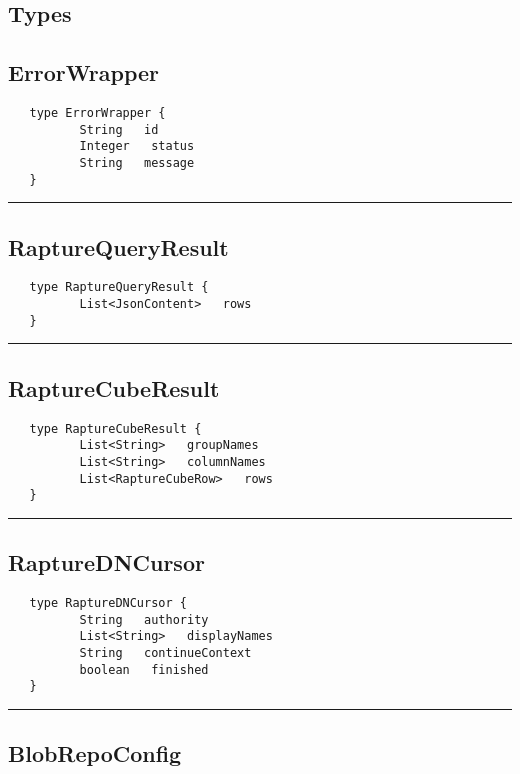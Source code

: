 \subsection{Types}
\subsection{ErrorWrapper}
\label{type:ErrorWrapper}

\begin{verbatim}
   type ErrorWrapper {
          String   id
          Integer   status
          String   message
   }
\end{verbatim}

\rule{15cm}{2pt}
\subsection{RaptureQueryResult}
\label{type:RaptureQueryResult}

\begin{verbatim}
   type RaptureQueryResult {
          List<JsonContent>   rows
   }
\end{verbatim}

\rule{15cm}{2pt}
\subsection{RaptureCubeResult}
\label{type:RaptureCubeResult}

\begin{verbatim}
   type RaptureCubeResult {
          List<String>   groupNames
          List<String>   columnNames
          List<RaptureCubeRow>   rows
   }
\end{verbatim}

\rule{15cm}{2pt}
\subsection{RaptureDNCursor}
\label{type:RaptureDNCursor}

\begin{verbatim}
   type RaptureDNCursor {
          String   authority
          List<String>   displayNames
          String   continueContext
          boolean   finished
   }
\end{verbatim}

\rule{15cm}{2pt}
\subsection{BlobRepoConfig}
\label{type:BlobRepoConfig}

